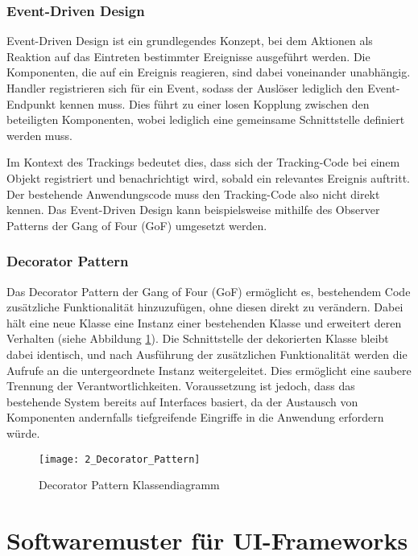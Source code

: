 \subsubsection{Event-Driven Design}
Event-Driven Design ist ein grundlegendes Konzept, bei dem Aktionen als Reaktion auf das Eintreten bestimmter Ereignisse ausgeführt werden.  
Die Komponenten, die auf ein Ereignis reagieren, sind dabei voneinander unabhängig.  
Handler registrieren sich für ein Event, sodass der Auslöser lediglich den Event-Endpunkt kennen muss.  
Dies führt zu einer losen Kopplung zwischen den beteiligten Komponenten, wobei lediglich eine gemeinsame Schnittstelle definiert werden muss.  

Im Kontext des Trackings bedeutet dies, dass sich der Tracking-Code bei einem Objekt registriert und benachrichtigt wird, sobald ein relevantes Ereignis auftritt. Der bestehende Anwendungscode muss den Tracking-Code also nicht direkt kennen. Das Event-Driven Design kann beispielsweise mithilfe des Observer Patterns der Gang of Four (GoF) \cite{gamma1995design} umgesetzt werden.

\subsubsection{Decorator Pattern}
Das Decorator Pattern der Gang of Four (GoF) \cite{gamma1995design} ermöglicht es, bestehendem Code zusätzliche Funktionalität hinzuzufügen, ohne diesen direkt zu verändern.  
Dabei hält eine neue Klasse eine Instanz einer bestehenden Klasse und erweitert deren Verhalten (siehe Abbildung \ref{fig:decorator_pattern}). 
Die Schnittstelle der dekorierten Klasse bleibt dabei identisch, und nach Ausführung der zusätzlichen Funktionalität werden die Aufrufe an die untergeordnete Instanz weitergeleitet. Dies ermöglicht eine saubere Trennung der Verantwortlichkeiten. Voraussetzung ist jedoch, dass das bestehende System bereits auf Interfaces basiert, da der Austausch von Komponenten andernfalls tiefgreifende Eingriffe in die Anwendung erfordern würde.

\begin{figure}[H]
\centering
\texttt{[image: 2\_Decorator\_Pattern]}
\caption{Decorator Pattern Klassendiagramm}
\label{fig:decorator_pattern}
\end{figure}

\section{Softwaremuster für UI-Frameworks}
\label{subsec:patterns}

